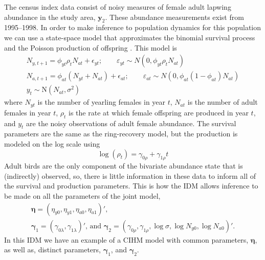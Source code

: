\documentclass[12pt]{article}
\newcommand{\by}{\mathbf{y}}
\newcommand{\bn}{\boldsymbol{\eta}}
\newcommand{\bg}{\boldsymbol{\gamma}}
\newcommand{\tN}{\text{N}}
\begin{document}
The census index data consist of noisy measures of female adult lapwing abundance in the study area, $\by_2$. These abundance measurements exist from 1995--1998. In order to make inference to population dynamics for this population we can use a state-space model that approximates the binomial survival process and the Poisson production of offspring \citep{besbeas2002integrating}. This model is
\begin{equation}
\begin{gathered}
N_{y,t+1} = \phi_{yt} \rho_t N_{at} + \epsilon_{yt};\qquad \varepsilon_{yt} \sim N(0, \phi_{yt} \rho_t N_{at})\\
N_{a,t+1} = \phi_{at} (N_{yt} + N_{at}) + \epsilon_{at};\qquad \varepsilon_{at} \sim N(0, \phi_{at} (1-\phi_{at}) N_{at})\\
y_{t} \sim \tN(N_{at}, \sigma^2)
\end{gathered}
\end{equation}
where $N_{yt}$ is the number of yearling females in year $t$, $N_{at}$ is the number of adult females in year $t$, $\rho_t$ is the rate at which female offspring are produced in year $t$, and $y_t$ are the noisy observations of adult female abundance. The survival parameters are the same as the ring-recovery model, but the production is modeled on the log scale using
\[
\log (\rho_t) = \gamma_{0\rho} + \gamma_{1\rho} t
\]
Adult birds are the only component of the bivariate abundance state that is (indirectly) observed, so, there is little information in these data to inform all of the survival and production parameters. This is how the IDM allows inference to be made on all the parameters of the joint model, 
\[
\begin{gathered} 
\bn = (\eta_{y0}, \eta_{y1}, \eta_{a0}, \eta_{a1})',  \\
\bg_1 = (\gamma_{0\lambda}, \gamma_{1\lambda})' \text{, and } \bg_2 = (\gamma_{0\rho}, \gamma_{1\rho}, \log\sigma, \log N_{y0}, \log N_{a0})'.
\end{gathered}
\]
In this IDM we have an example of a CIHM model with common parameters, $\bn$, as well as, distinct parameters, $\bg_1$, and $\bg_2$. 
\end{document}
